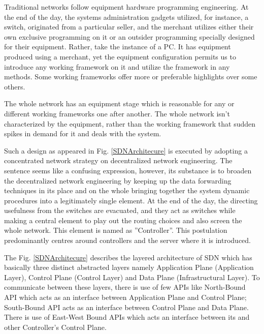     Traditional networks follow equipment hardware programming engineering. At the end of the day, the systems administration gadgets utilized, for instance, a switch, originated from a particular seller, and the merchant utilizes either their own exclusive programming on it or an outsider programming specially designed for their equipment. Rather, take the instance of a PC. It has equipment produced using a merchant, yet the equipment configuration permits us to introduce any working framework on it and utilize the framework in any methods. Some working frameworks offer more or preferable highlights over some others.
    
     The whole network has an equipment stage which is reasonable for any or different working frameworks one after another. The whole network isn't characterized by the equipment, rather than the working framework that sudden spikes in demand for it and deals with the system.
    
    Such a design as appeared in Fig. \ref{SDNArchitecure} is executed by adopting a concentrated network strategy on decentralized network engineering. The sentence seems like a confusing expression, however, its substance is to broaden the decentralized network engineering by keeping up the data forwarding techniques in its place and on the whole bringing together the system dynamic procedures into a legitimately single element. At the end of the day, the directing usefulness from the switches are evacuated, and they act as switches while making a central element to play out the routing choices and also screen the whole network. This element is named as ''Controller''. This postulation predominantly centres around controllers and the server where it is introduced.
    
    The Fig. \ref{SDNArchitecure} describes the layered architecture of SDN which has basically three distinct abstracted layers namely Application Plane (Application Layer), Control Plane (Control Layer) and Data Plane (Infrastructural Layer). To communicate between these layers, there is use of few APIs like North-Bound API which acts as an interface between Application Plane and Control Plane; South-Bound API acts as an interface between Control Plane and Data Plane. There is use of East-West Bound APIs which acts an interface between its and other Controller's Control Plane.
    
